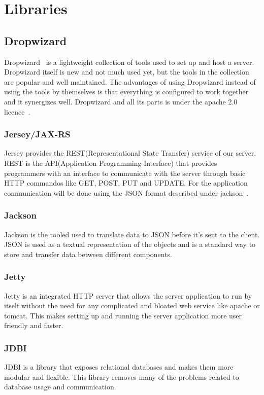 \section{Libraries}

\subsection{Dropwizard}
Dropwizard~\cite{dropwizard} is a lightweight collection of tools used to set up and host a server. Dropwizard itself is new and not much used yet, but the tools in the collection are popular and well maintained. The advantages of using Dropwizard instead of using the tools by themselves is that everything is configured to work together and it synergizes well.
Dropwizard and all its parts is under the apache 2.0 licence~\cite{apache20}. 

\subsubsection{Jersey/JAX-RS}
Jersey provides the REST(Representational State Transfer) service of our server. REST is the API(Application Programming Interface) that provides programmers with an interface to communicate with the server through basic HTTP commandos like GET, POST, PUT and UPDATE. For the application communication will be done using the JSON format described under jackson~\cite{jackson}.

\subsubsection{Jackson}
Jackson is the tooled used to translate data to JSON before it’s sent to the client. JSON is used as a textual representation of the objects and is a standard way to store and transfer data between different components.

\subsubsection{Jetty}
Jetty is an integrated HTTP server that allows the server application to run by itself without the need for any  complicated and bloated web service like apache or tomcat. This makes setting up and running the server application more user friendly and faster.

\subsubsection{JDBI}
JDBI is a library that exposes relational databases and makes them more modular and flexible. This library removes many of the problems related to database usage and communication.

